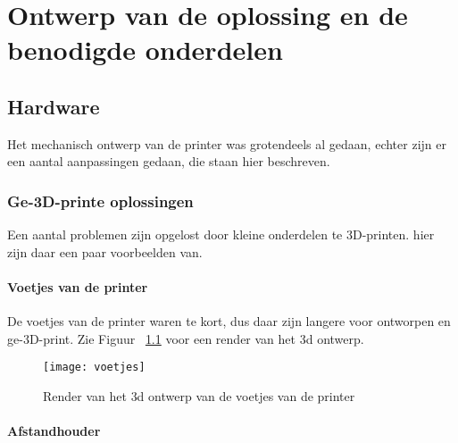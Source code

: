 \chapter{Ontwerp van de oplossing en de benodigde onderdelen}
\label{Ontwerp_van_de_oplossing_en_de_benodigde_onderdelen}

\section{Hardware}

Het mechanisch ontwerp van de printer was grotendeels al gedaan, echter zijn er
een aantal aanpassingen gedaan, die staan hier beschreven.

\subsection{Ge-3D-printe oplossingen}

Een aantal problemen zijn opgelost door kleine onderdelen te 3D-printen. hier zijn
daar een paar voorbeelden van.

\subsubsection{Voetjes van de printer}

De voetjes van de printer waren te kort, dus daar zijn langere voor
ontworpen en ge-3D-print. Zie Figuur ~\ref{fig:voetjes} voor een render van
het \ac{3d} ontwerp.

\begin{figure}[h]
    \centerline{\texttt{[image: voetjes]}}
    \caption{Render van het \ac{3d} ontwerp van de voetjes van de printer}
    \label{fig:voetjes}
\end{figure}

\subsubsection{Afstandhouder}

